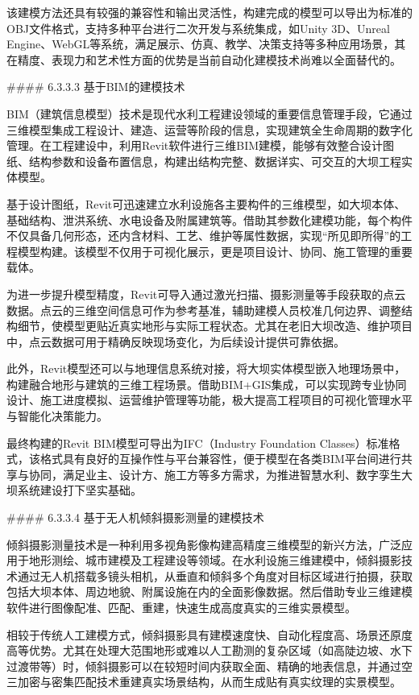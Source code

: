 该建模方法还具有较强的兼容性和输出灵活性，构建完成的模型可以导出为标准的OBJ文件格式，支持多种平台进行二次开发与系统集成，如Unity 3D、Unreal Engine、WebGL等系统，满足展示、仿真、教学、决策支持等多种应用场景，其在精度、表现力和艺术性方面的优势是当前自动化建模技术尚难以全面替代的。

\#\#\#\# 6.3.3.3 基于BIM的建模技术

BIM（建筑信息模型）技术是现代水利工程建设领域的重要信息管理手段，它通过三维模型集成工程设计、建造、运营等阶段的信息，实现建筑全生命周期的数字化管理。在工程建设中，利用Revit软件进行三维BIM建模，能够有效整合设计图纸、结构参数和设备布置信息，构建出结构完整、数据详实、可交互的大坝工程实体模型。

基于设计图纸，Revit可迅速建立水利设施各主要构件的三维模型，如大坝本体、基础结构、泄洪系统、水电设备及附属建筑等。借助其参数化建模功能，每个构件不仅具备几何形态，还内含材料、工艺、维护等属性数据，实现``所见即所得''的工程模型构建。该模型不仅用于可视化展示，更是项目设计、协同、施工管理的重要载体。

为进一步提升模型精度，Revit可导入通过激光扫描、摄影测量等手段获取的点云数据。点云的三维空间信息可作为参考基准，辅助建模人员校准几何边界、调整结构细节，使模型更贴近真实地形与实际工程状态。尤其在老旧大坝改造、维护项目中，点云数据可用于精确反映现场变化，为后续设计提供可靠依据。

此外，Revit模型还可以与地理信息系统对接，将大坝实体模型嵌入地理场景中，构建融合地形与建筑的三维工程场景。借助BIM+GIS集成，可以实现跨专业协同设计、施工进度模拟、运营维护管理等功能，极大提高工程项目的可视化管理水平与智能化决策能力。

最终构建的Revit BIM模型可导出为IFC（Industry Foundation Classes）标准格式，该格式具有良好的互操作性与平台兼容性，便于模型在各类BIM平台间进行共享与协同，满足业主、设计方、施工方等多方需求，为推进智慧水利、数字孪生大坝系统建设打下坚实基础。

\#\#\#\# 6.3.3.4 基于无人机倾斜摄影测量的建模技术

倾斜摄影测量技术是一种利用多视角影像构建高精度三维模型的新兴方法，广泛应用于地形测绘、城市建模及工程建设等领域。在水利设施三维建模中，倾斜摄影技术通过无人机搭载多镜头相机，从垂直和倾斜多个角度对目标区域进行拍摄，获取包括大坝本体、周边地貌、附属设施在内的全面影像数据。然后借助专业三维建模软件进行图像配准、匹配、重建，快速生成高度真实的三维实景模型。

相较于传统人工建模方式，倾斜摄影具有建模速度快、自动化程度高、场景还原度高等优势。尤其在处理大范围地形或难以人工勘测的复杂区域（如高陡边坡、水下过渡带等）时，倾斜摄影可以在较短时间内获取全面、精确的地表信息，并通过空三加密与密集匹配技术重建真实场景结构，从而生成贴有真实纹理的实景模型。

